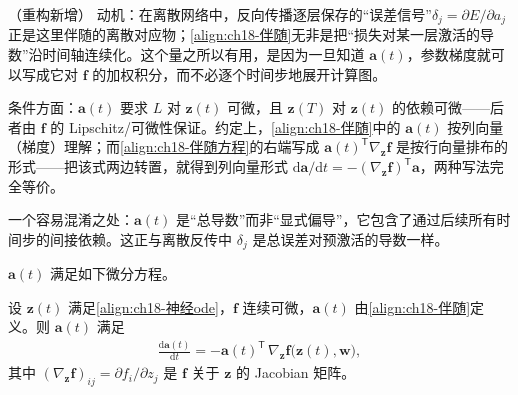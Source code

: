 \documentclass[../../main.tex]{subfiles}
\begin{document}
\begin{remark}（重构新增）
动机：在离散网络中，反向传播逐层保存的“误差信号”$\delta_j=\partial E/\partial a_j$ 正是这里伴随的离散对应物；\eqref{align:ch18-伴随}无非是把“损失对某一层激活的导数”沿时间轴连续化。这个量之所以有用，是因为一旦知道 $\bm{a}(t)$，参数梯度就可以写成它对 $\bm{f}$ 的加权积分，而不必逐个时间步地展开计算图。

条件方面：$\bm{a}(t)$ 要求 $L$ 对 $\bm{z}(t)$ 可微，且 $\bm{z}(T)$ 对 $\bm{z}(t)$ 的依赖可微——后者由 $\bm{f}$ 的 Lipschitz/可微性保证。约定上，\eqref{align:ch18-伴随}中的 $\bm{a}(t)$ 按列向量（梯度）理解；而\eqref{align:ch18-伴随方程}的右端写成 $\bm{a}(t)^{\mathsf T}\nabla_{\bm{z}}\bm{f}$ 是按行向量排布的形式——把该式两边转置，就得到列向量形式 $\mathrm{d}\bm{a}/\mathrm{d}t=-(\nabla_{\bm{z}}\bm{f})^{\mathsf T}\bm{a}$，两种写法完全等价。

一个容易混淆之处：$\bm{a}(t)$ 是“总导数”而非“显式偏导”，它包含了通过后续所有时间步的间接依赖。这正与离散反传中 $\delta_j$ 是总误差对预激活的导数一样。
\end{remark}

$\bm{a}(t)$ 满足如下微分方程。

\begin{proposition}[伴随方程]\label{proposition:ch18-伴随方程}
设 $\bm{z}(t)$ 满足\eqref{align:ch18-神经ode}，$\bm{f}$ 连续可微，$\bm{a}(t)$ 由\eqref{align:ch18-伴随}定义。则 $\bm{a}(t)$ 满足
\begin{align}
  \frac{\mathrm{d}\bm{a}(t)}{\mathrm{d}t}=-\bm{a}(t)^{\mathsf T}\,\nabla_{\bm{z}}\bm{f}\big(\bm{z}(t),\bm{w}\big),\label{align:ch18-伴随方程}
\end{align}
其中 $(\nabla_{\bm{z}}\bm{f})_{ij}=\partial f_i/\partial z_j$ 是 $\bm{f}$ 关于 $\bm{z}$ 的 Jacobian 矩阵。
\end{proposition}
\end{document}
